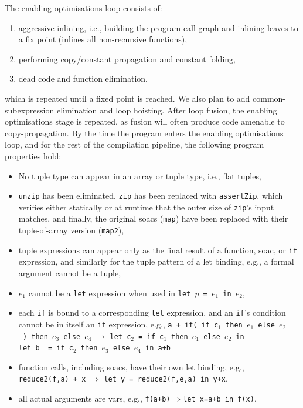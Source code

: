 \documentclass{sigplanconf}  %
\begin{document}
The enabling optimisations loop consists of:
\begin{enumerate}
\item aggressive inlining, i.e., building the program call-graph
  and inlining leaves to a fix point (inlines all non-recursive functions),
\item performing copy/constant propagation and constant folding,
\item dead code and function elimination,
\end{enumerate}
which is repeated until a fixed point is reached.  We also plan to add
common-subexpression elimination and loop hoisting.  After loop
fusion, the enabling optimisations stage is repeated, as fusion will
often produce code amenable to copy-propagation.  By the time the
program enters the enabling optimisations loop, and for the rest of
the compilation pipeline, the following program properties hold:

\begin{itemize}
\item No tuple type can appear in an array or tuple type, i.e., flat tuples,
\item {\tt unzip} has been eliminated, {\tt zip} has been
  replaced with {\tt assertZip}, which verifies either
  statically or at runtime that the outer size of {\tt zip}'s
  input matches, and finally, the original {\sc soac}s ({\tt map})
  have been replaced with their tuple-of-array version ({\tt map2}),
\item tuple expressions can appear only as the final result of
  a function, {\sc soac}, or {\tt if} expression, and similarly
  for the tuple pattern of a let binding, e.g., a formal argument
  cannot be a tuple,
\item %
  $e_1$ cannot be a {\tt let} expression when used 
  in {\tt let~$p$~=~$e_1$~in~$e_2$},
\item each {\tt if} is bound to a corresponding {\tt let} expression, and an
  {\tt if}'s condition cannot be in itself an {\tt if} expression, e.g.,
  {\tt a~+~if(~if~c$_1$~then~$e_1$~else~$e_2$~)~then~$e_3$~else~$e_4$} $\rightarrow$
  {\tt let~c$_2$~=~if~c$_1$~then~$e_1$~else~$e_2$~in}\\
  {\tt let~b~~=~if~c$_2$~then~$e_3$~else~$e_4$~in~a+b}
\item function calls, including {\sc soac}s, have their own let binding,
  e.g., {\tt reduce2(f,a)~+~x} $\Rightarrow$
  {\tt let~y~=~reduce2(f,e,a)~in~y+x},
\item all actual arguments are vars,
  e.g., {\tt f(a+b)}$\Rightarrow${\tt let~x=a+b~in~f(x)}.
\end{itemize}
\end{document}
